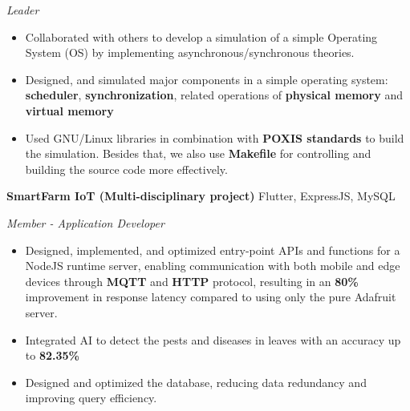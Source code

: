 \documentclass[a4paper,10pt]{article}
\begin{document}
\textit{Leader} \hfill 
\begin{itemize}[noitemsep, topsep=0pt, partopsep=0pt, parsep=0pt]
    \item Collaborated with others to develop a simulation of a simple Operating System (OS) by implementing asynchronous/synchronous theories.
    \item Designed, and simulated major components in a simple operating system: \textbf{scheduler}, \textbf{synchronization}, related operations of \textbf{physical memory} and \textbf{virtual memory}
    \item Used GNU/Linux libraries in combination with \textbf{POXIS standards} to build the simulation. Besides that, we also use \textbf{Makefile} for controlling and building the source code more effectively.
\end{itemize}
\vspace{6pt}
\textbf{SmartFarm IoT (Multi-disciplinary project)}	\hfill Flutter, ExpressJS, MySQL

\textit{Member - Application Developer} \hfill 
\begin{itemize}[noitemsep, topsep=0pt, partopsep=0pt, parsep=0pt]
    
    \item Designed, implemented, and optimized entry-point APIs and functions for a NodeJS runtime server, enabling communication with both mobile and edge devices through \textbf{MQTT} and \textbf{HTTP} protocol, resulting in an \textbf{80\%} improvement in response latency compared to using only the pure Adafruit server.
    \item Integrated AI to detect the pests and diseases in leaves with an accuracy up to \textbf{82.35\%}
    \item Designed and optimized the database, reducing data redundancy and improving query efficiency.
    
\end{itemize}

\end{document}
